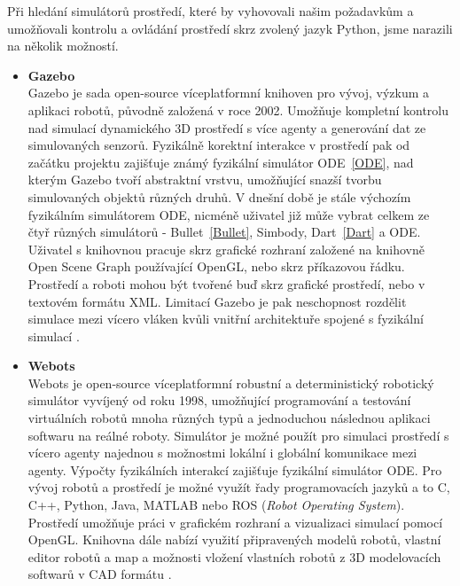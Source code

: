 Při hledání simulátorů prostředí, které by vyhovovali našim požadavkům a
umožňovali kontrolu a ovládání prostředí skrz zvolený jazyk Python, jsme
narazili na několik možností.

\begin{itemize}
    \item \textbf{Gazebo}\\
        Gazebo je sada open-source víceplatformní knihoven pro vývoj, výzkum a
        aplikaci robotů, původně založená v roce 2002. Umožňuje kompletní
        kontrolu nad simulací dynamického 3D prostředí s více agenty a
        generování dat ze simulovaných senzorů. Fyzikálně korektní interakce v
        prostředí pak od začátku projektu zajišťuje známý fyzikální simulátor
        ODE~\ref{ODE}, nad kterým Gazebo tvoří abstraktní vrstvu, umožňující
        snazší tvorbu simulovaných objektů různých druhů. V dnešní době je
        stále výchozím fyzikálním simulátorem ODE, nicméně uživatel již může
        vybrat celkem ze čtyř různých simulátorů - Bullet~\ref{Bullet},
        Simbody, Dart~\ref{Dart} a ODE. Uživatel s knihovnou pracuje skrz
        grafické rozhraní založené na knihovně Open Scene Graph používající
        OpenGL, nebo skrz příkazovou řádku. Prostředí a roboti mohou být
        tvořené buď skrz grafické prostředí, nebo v textovém formátu XML.
        Limitací Gazebo je pak neschopnost rozdělit simulace mezi vícero vláken
        kvůli vnitřní architektuře spojené s fyzikální simulací
        \citep{koenig2004design}. 

    \item \textbf{Webots}\\
        Webots je open-source víceplatformní robustní a deterministický
        robotický simulátor vyvíjený od roku 1998, umožňující programování a
        testování virtuálních robotů mnoha různých typů a jednoduchou následnou
        aplikaci softwaru na reálné roboty. Simulátor je možné použít pro
        simulaci prostředí s vícero agenty najednou s možnostmi lokální i
        globální komunikace mezi agenty. Výpočty fyzikálních interakcí
        zajišťuje fyzikální simulátor ODE. Pro vývoj robotů a
        prostředí je možné využít řady programovacích jazyků a to C, C++,
        Python, Java, MATLAB nebo ROS (\emph{Robot Operating System}).
        Prostředí umožňuje práci v grafickém rozhraní a vizualizaci simulací
        pomocí OpenGL. Knihovna dále nabízí využití připravených modelů robotů,
        vlastní editor robotů a map a možnosti vložení vlastních robotů z 3D
        modelovacích softwarů v CAD formátu \citep{michel2004cyberbotics}
        \citep{Webots}.


\end{itemize}
